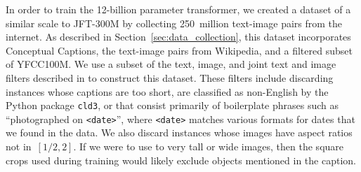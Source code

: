 \documentclass{article}
\begin{document}
In order to train the 12-billion parameter transformer, we created a dataset of a similar scale to JFT-300M by collecting 250~million text-image pairs from the internet. As described in Section~\ref{sec:data_collection}, this dataset incorporates Conceptual Captions, the text-image pairs from Wikipedia, and a filtered subset of YFCC100M. We use a subset of the text, image, and joint text and image filters described in \citet{sharma2018conceptual} to construct this dataset. These filters include discarding instances whose captions are too short, are classified as non-English by the Python package \texttt{cld3}, or that consist primarily of boilerplate phrases such as ``photographed on \texttt{<date>}'', where \texttt{<date>} matches various formats for dates that we found in the data. We also discard instances whose images have aspect ratios not in~$[1 / 2, 2]$. If we were to use to very tall or wide images, then the square crops used during training would likely exclude objects mentioned in the caption.
\end{document}
